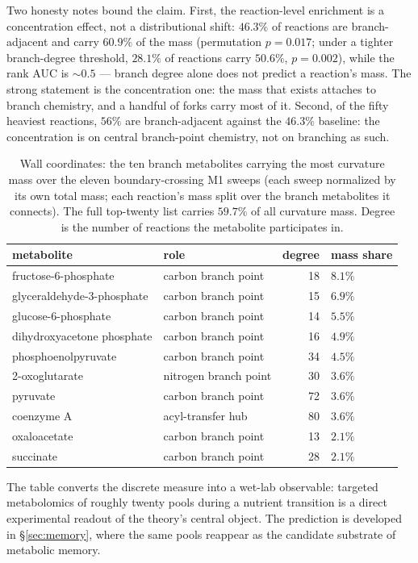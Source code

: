 \documentclass[11pt,a4paper]{article}
\theoremstyle{plain}
\theoremstyle{definition}
\theoremstyle{remark}
\begin{document}
Two honesty notes bound the claim. First, the reaction-level
enrichment is a concentration effect, not a distributional shift:
$46.3\%$ of reactions are branch-adjacent and carry $60.9\%$ of
the mass (permutation $p = 0.017$; under a tighter branch-degree
threshold, $28.1\%$ of reactions carry $50.6\%$, $p = 0.002$),
while the rank AUC is $\sim 0.5$ --- branch degree alone does not
predict a reaction's mass. The strong statement is the
concentration one: the mass that exists attaches to branch
chemistry, and a handful of forks carry most of it. Second, of the
fifty heaviest reactions, $56\%$ are branch-adjacent against the
$46.3\%$ baseline: the concentration is on central branch-point
chemistry, not on branching as such.

\begin{table}[t]
\centering
\caption{Wall coordinates: the ten branch metabolites carrying the
most curvature mass over the eleven boundary-crossing M1 sweeps
(each sweep normalized by its own total mass; each reaction's mass
split over the branch metabolites it connects). The full top-twenty
list carries $59.7\%$ of all curvature mass. Degree is the number
of reactions the metabolite participates in.}
\label{tab:walls}
\small
\begin{tabular}{llrl}
\toprule
metabolite & role & degree & mass share \\
\midrule
fructose-6-phosphate & carbon branch point & 18 & $8.1\%$ \\
glyceraldehyde-3-phosphate & carbon branch point & 15 & $6.9\%$ \\
glucose-6-phosphate & carbon branch point & 14 & $5.5\%$ \\
dihydroxyacetone phosphate & carbon branch point & 16 & $4.9\%$ \\
phosphoenolpyruvate & carbon branch point & 34 & $4.5\%$ \\
2-oxoglutarate & nitrogen branch point & 30 & $3.6\%$ \\
pyruvate & carbon branch point & 72 & $3.6\%$ \\
coenzyme A & acyl-transfer hub & 80 & $3.6\%$ \\
oxaloacetate & carbon branch point & 13 & $2.1\%$ \\
succinate & carbon branch point & 28 & $2.1\%$ \\
\bottomrule
\end{tabular}
\end{table}

The table converts the discrete measure into a wet-lab observable:
targeted metabolomics of roughly twenty pools during a nutrient
transition is a direct experimental readout of the theory's
central object. The prediction is developed in
\S\ref{sec:memory}, where the same pools reappear as the candidate
substrate of metabolic memory.
\end{document}
